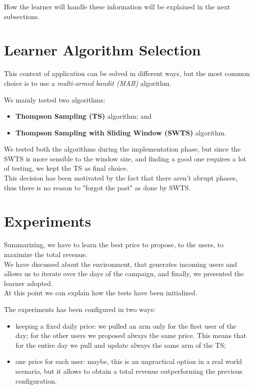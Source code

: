 How the learner will handle these information will be explained in the next subsections.

\section{Learner Algorithm Selection}

This context of application can be solved in different ways, but the most common choice is to use a \textit{multi-armed bandit (MAB)} algorithm.

We mainly tested two algorithms:
\begin{itemize}
	\item \textbf{Thompson Sampling (TS)} algorithm; and
	\item \textbf{Thompson Sampling with Sliding Window (SWTS)} algorithm.
\end{itemize}

We tested both the algorithms during the implementation phase, but since the SWTS is more sensible to the window size, and finding a good one requires a lot of testing, we kept the TS as final choice.\\
This decision has been motivated by the fact that there aren't abrupt phases, thus there is no reason to "forgot the past" as done by SWTS.


\section{Experiments}

Summarizing, we have to learn the best price to propose, to the users, to maximize the total revenue.\\
We have discussed about the environment, that generates incoming users and allows us to iterate over the days of the campaign, and finally, we presented the learner adopted.\\
At this point we can explain how the tests have been initialized.

The experiments has been configured in two ways:
\begin{itemize}
	\item keeping a fixed daily price: we pulled an arm only for the first user of the day; for the other users we proposed always the same price. This means that for the entire day we pull and update always the same arm of the TS;
	\item one price for each user: maybe, this is an unpractical option in a real world scenario, but it allows to obtain a total revenue outperforming the previous configuration.
\end{itemize}

